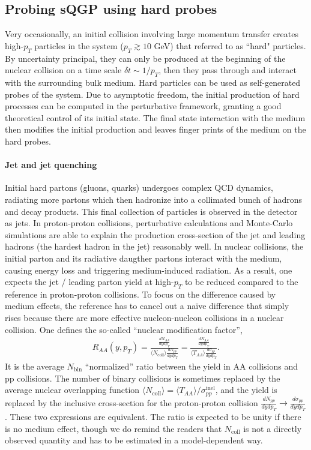\subsection{Probing sQGP using hard probes}
Very occasionally, an initial collision involving large momentum transfer creates high-$p_T$ particles in the system ($p_T\gtrsim 10$ GeV) that referred to as ``hard" particles.
By uncertainty principal, they can only be produced at the beginning of the nuclear collision on a time scale $\delta t \sim 1/p_T$, then they pass through and interact with the surrounding bulk medium.
Hard particles can be used as self-generated probes of the system.
Due to asymptotic freedom, the initial production of hard processes can be computed in the perturbative framework, granting a good theoretical control of its initial state.
The final state interaction with the medium then modifies the initial production and leaves finger prints of the medium on the hard probes.

\paragraph{Jet and jet quenching}
Initial hard partons (gluons, quarks) undergoes complex QCD dynamics, radiating more partons which then hadronize into a collimated bunch of hadrons and decay products.
This final collection of particles is observed in the detector as jets.
In proton-proton collisions, perturbative calculations and Monte-Carlo simulations are able to explain the production cross-section of the jet and leading hadrons (the hardest hadron in the jet) reasonably well.
In nuclear collisions, the initial parton and its radiative daugther partons interact with the medium, causing energy loss and triggering medium-induced radiation.
As a result, one expects the jet / leading parton yield at high-$p_T$ to be reduced compared to the reference in proton-proton collisions.
To focus on the difference caused by medium effects, the reference has to cancel out a na\"ive difference that simply rises because there are more effective nucleon-nucleon collisions in a nuclear collision.
One defines the so-called ``nuclear modification factor'',
\begin{eqnarray}
R_{AA}(y, p_T) = \frac{\frac{dN_{AA}}{dy dp_T}}{\langle N_{\textrm{coll}}\rangle \frac{dN_{pp}}{dy dp_T}} = \frac{\frac{dN_{AA}}{dy dp_T}}{\langle T_{AA} \rangle \frac{d\sigma_{pp}}{dy dp_T}}.
\end{eqnarray}
It is the average $N_{\textrm{bin}}$ ``normalized'' ratio between the yield in AA collisions and pp collisions.
The number of binary collisions is sometimes replaced by the average nuclear overlapping function $\langle N_{\textrm{coll}}\rangle = \langle T_{AA} \rangle /\sigma_{pp}^{\textrm{inel}}$, and the yield is replaced by the inclusive cross-section for the proton-proton collision $\frac{dN_{pp}}{dy dp_T}\rightarrow \frac{d\sigma_{pp}}{dy dp_T}$.
These two expressions are equivalent.
The ratio is expected to be unity if there is no medium effect, though we do remind the readers that $N_{\textrm{coll}}$ is not a directly observed quantity and has to be estimated in a model-dependent way.

